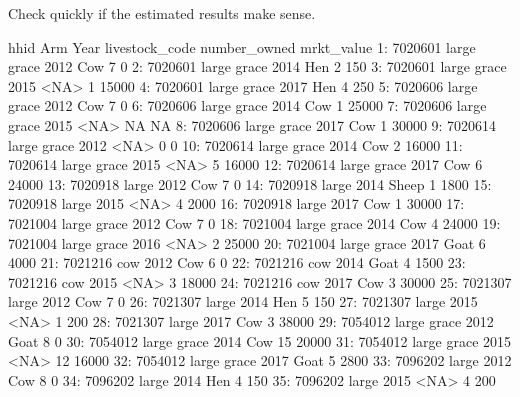Check quickly if the estimated results make sense.
\begin{Schunk}
\begin{Soutput}
       hhid         Arm Year livestock_code number_owned mrkt_value
 1: 7020601 large grace 2012            Cow            7          0
 2: 7020601 large grace 2014            Hen            2        150
 3: 7020601 large grace 2015           <NA>            1      15000
 4: 7020601 large grace 2017            Hen            4        250
 5: 7020606 large grace 2012            Cow            7          0
 6: 7020606 large grace 2014            Cow            1      25000
 7: 7020606 large grace 2015           <NA>           NA         NA
 8: 7020606 large grace 2017            Cow            1      30000
 9: 7020614 large grace 2012           <NA>            0          0
10: 7020614 large grace 2014            Cow            2      16000
11: 7020614 large grace 2015           <NA>            5      16000
12: 7020614 large grace 2017            Cow            6      24000
13: 7020918       large 2012            Cow            7          0
14: 7020918       large 2014          Sheep            1       1800
15: 7020918       large 2015           <NA>            4       2000
16: 7020918       large 2017            Cow            1      30000
17: 7021004 large grace 2012            Cow            7          0
18: 7021004 large grace 2014            Cow            4      24000
19: 7021004 large grace 2016           <NA>            2      25000
20: 7021004 large grace 2017           Goat            6       4000
21: 7021216         cow 2012            Cow            6          0
22: 7021216         cow 2014           Goat            4       1500
23: 7021216         cow 2015           <NA>            3      18000
24: 7021216         cow 2017            Cow            3      30000
25: 7021307       large 2012            Cow            7          0
26: 7021307       large 2014            Hen            5        150
27: 7021307       large 2015           <NA>            1        200
28: 7021307       large 2017            Cow            3      38000
29: 7054012 large grace 2012           Goat            8          0
30: 7054012 large grace 2014            Cow           15      20000
31: 7054012 large grace 2015           <NA>           12      16000
32: 7054012 large grace 2017           Goat            5       2800
33: 7096202       large 2012            Cow            8          0
34: 7096202       large 2014            Hen            4        150
35: 7096202       large 2015           <NA>            4        200

\end{Soutput}
\end{Schunk}

